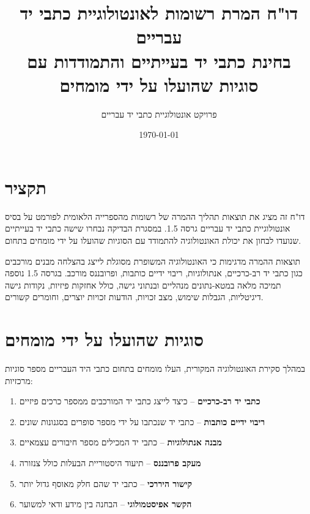 \documentclass[12pt,a4paper]{article}
\title{דו"ח המרת רשומות \en{MARC} לאונטולוגיית כתבי יד עבריים\\
\large בחינת כתבי יד בעייתיים והתמודדות עם סוגיות שהועלו על ידי מומחים}
\author{פרויקט אונטולוגיית כתבי יד עבריים}
\date{\today}
\newcommand{\en}[1]{\textenglish{\LR{#1}}}
\begin{document}
\maketitle

\section{תקציר}

דו"ח זה מציג את תוצאות תהליך ההמרה של רשומות \en{MARC} מהספרייה הלאומית לפורמט \en{RDF/Turtle} על בסיס אונטולוגיית כתבי יד עבריים גרסה 1.5. במסגרת הבדיקה נבחרו שישה כתבי יד בעייתיים שנועדו לבחון את יכולת האונטולוגיה להתמודד עם הסוגיות שהועלו על ידי מומחים בתחום.

תוצאות ההמרה מדגימות כי האונטולוגיה המשופרת מסוגלת לייצג בהצלחה מבנים מורכבים כגון כתבי יד רב-כרכיים, אנתולוגיות, ריבוי ידיים כותבות, ופרובננס מורכב. בגרסה 1.5 נוספה תמיכה מלאה במטא-נתונים מנהליים ובנתוני גישה, כולל אחזקות פיזיות, נקודות גישה דיגיטליות, הגבלות שימוש, מצב זכויות, הודעות זכויות יוצרים, וחומרים קשורים.

\section{סוגיות שהועלו על ידי מומחים}

במהלך סקירת האונטולוגיה המקורית, העלו מומחים בתחום כתבי היד העבריים מספר סוגיות מרכזיות:

\begin{enumerate}
    \item \textbf{כתבי יד רב-כרכיים} -- כיצד לייצג כתבי יד המורכבים ממספר כרכים פיזיים
    \item \textbf{ריבוי ידיים כותבות} -- כתבי יד שנכתבו על ידי מספר סופרים בסגנונות שונים
    \item \textbf{מבנה אנתולוגיות} -- כתבי יד המכילים מספר חיבורים עצמאיים
    \item \textbf{מעקב פרובננס} -- תיעוד היסטוריית הבעלות כולל צנזורה
    \item \textbf{קישור היררכי} -- כתבי יד שהם חלק מאוסף גדול יותר
    \item \textbf{הקשר אפיסטמולוגי} -- הבחנה בין מידע ודאי למשוער
\end{enumerate}
\end{document}

